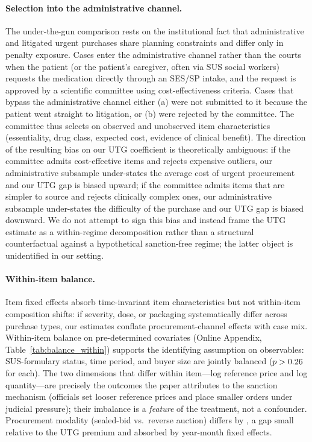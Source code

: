 \paragraph{Selection into the administrative channel.} The under-the-gun comparison rests on the institutional fact that administrative and litigated urgent purchases share planning constraints and differ only in penalty exposure. Cases enter the administrative channel rather than the courts when the patient (or the patient's caregiver, often via SUS social workers) requests the medication directly through an SES/SP intake, and the request is approved by a scientific committee using cost-effectiveness criteria. Cases that bypass the administrative channel either (a) were not submitted to it because the patient went straight to litigation, or (b) were rejected by the committee. The committee thus selects on observed and unobserved item characteristics (essentiality, drug class, expected cost, evidence of clinical benefit). The direction of the resulting bias on our UTG coefficient is theoretically ambiguous: if the committee admits cost-effective items and rejects expensive outliers, our administrative subsample under-states the average cost of urgent procurement and our UTG gap is biased upward; if the committee admits items that are simpler to source and rejects clinically complex ones, our administrative subsample under-states the difficulty of the purchase and our UTG gap is biased downward. We do not attempt to sign this bias and instead frame the UTG estimate as a within-regime decomposition rather than a structural counterfactual against a hypothetical sanction-free regime; the latter object is unidentified in our setting.

\paragraph{Within-item balance.} Item fixed effects absorb time-invariant item characteristics but not within-item composition shifts: if severity, dose, or packaging systematically differ across purchase types, our estimates conflate procurement-channel effects with case mix. Within-item balance on pre-determined covariates (Online Appendix, Table~\ref{tab:balance_within}) supports the identifying assumption on observables: SUS-formulary status, time period, and buyer size are jointly balanced ($p > 0.26$ for each). The two dimensions that differ within item---log reference price and log quantity---are precisely the outcomes the paper attributes to the sanction mechanism (officials set looser reference prices and place smaller orders under judicial pressure); their imbalance is a \emph{feature} of the treatment, not a confounder. Procurement modality (sealed-bid vs.\ reverse auction) differs by \BPbalModalityPP, a gap small relative to the \BPutgPctRange{} UTG premium and absorbed by year-month fixed effects.

